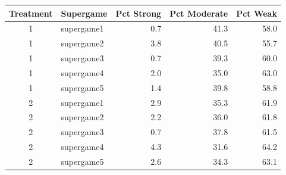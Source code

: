 \begin{tabular}{clrrr}
  \toprule
  Treatment & Supergame & Pct Strong & Pct Moderate & Pct Weak \\ 
  \midrule
  1 & supergame1 & 0.7 & 41.3 & 58.0 \\ 
  1 & supergame2 & 3.8 & 40.5 & 55.7 \\ 
  1 & supergame3 & 0.7 & 39.3 & 60.0 \\ 
  1 & supergame4 & 2.0 & 35.0 & 63.0 \\ 
  1 & supergame5 & 1.4 & 39.8 & 58.8 \\ 
  2 & supergame1 & 2.9 & 35.3 & 61.9 \\ 
  2 & supergame2 & 2.2 & 36.0 & 61.8 \\ 
  2 & supergame3 & 0.7 & 37.8 & 61.5 \\ 
  2 & supergame4 & 4.3 & 31.6 & 64.2 \\ 
  2 & supergame5 & 2.6 & 34.3 & 63.1 \\ 
  \bottomrule
\end{tabular}
